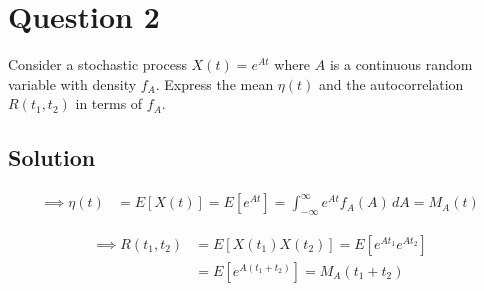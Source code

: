 \section*{Question 2}

Consider a stochastic process \( X(t)=e^{A t} \) where \( A \) is a continuous random variable with density \( f_{A} \).
Express the mean \( \eta(t) \) and the autocorrelation \( R\left(t_{1}, t_{2}\right) \) in terms of \( f_{A} \).

\subsection*{Solution}

\begin{align*}
    \implies
    \eta(t)
     & =
    E[X(t)]
    =
    E[e^{A t}]
    =
    \int_{-\infty}^{\infty} e^{A t} f_{A}(A) \, dA
    =
    M_A(t)
\end{align*}

\begin{align*}
    \implies
    R\left(t_{1}, t_{2}\right)
     & =
    E[X(t_{1})X(t_{2})]
    =
    E[e^{A t_{1}} e^{A t_{2}}]
    \\ & =
    E[e^{A(t_{1}+t_{2})}]
    =
    M_A(t_{1}+t_{2})
\end{align*}
